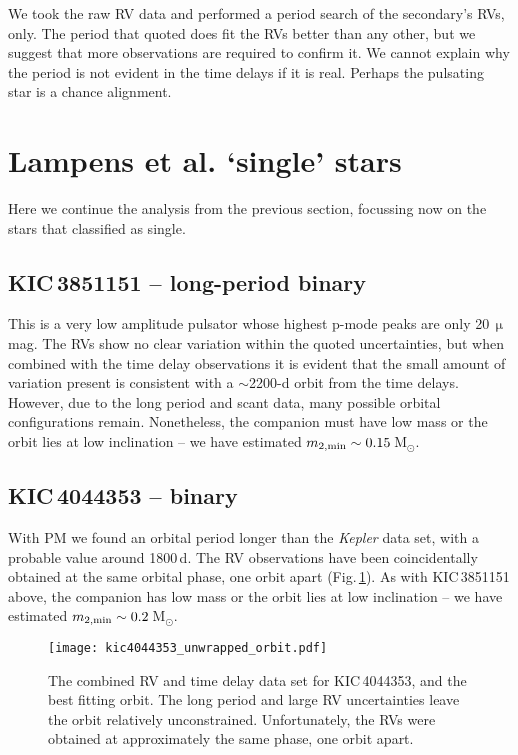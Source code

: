 \documentclass[a4paper,fleqn,usenatbib]{mnras}
\begin{document}
We took the raw RV data and performed a period search of the secondary's RVs, only. The period that \citeauthor{lampensetal2017} quoted does fit the RVs better than any other, but we suggest that more observations are required to confirm it. We cannot explain why the period is not evident in the time delays if it is real. Perhaps the pulsating star is a chance alignment.



\section{Lampens et al. `single' stars}
\label{app:single}

Here we continue the analysis from the previous section, focussing now on the stars that \citeauthor{lampensetal2017} classified as single.


\subsection{KIC\,3851151 -- long-period binary}
This is a very low amplitude pulsator whose highest p-mode peaks are only 20\,$\upmu$mag. The RVs show no clear variation within the quoted uncertainties, but when combined with the time delay observations it is evident that the small amount of variation present is consistent with a $\sim$2200-d orbit from the time delays. However, due to the long period and scant data, many possible orbital configurations remain. Nonetheless, the companion must have low mass or the orbit lies at low inclination -- we have estimated $m_{\rm 2,min} \sim 0.15$\,M$_{\odot}$.


\subsection{KIC\,4044353 -- binary}
With PM we found an orbital period longer than the \textit{Kepler} data set, with a probable value around 1800\,d. The RV observations have been coincidentally obtained at the same orbital phase, one orbit apart (Fig.\,\ref{fig:4044353}). As with KIC\,3851151 above, the companion has low mass or the orbit lies at low inclination -- we have estimated $m_{\rm 2,min} \sim 0.2$\,M$_{\odot}$.

\begin{figure}
\begin{center}
\texttt{[image: kic4044353\_unwrapped\_orbit.pdf]}
\caption{The combined RV and time delay data set for KIC\,4044353, and the best fitting orbit. The long period and large RV uncertainties leave the orbit relatively unconstrained. Unfortunately, the RVs were obtained at approximately the same phase, one orbit apart.}
\label{fig:4044353}
\end{center}
\end{figure}
\end{document}
